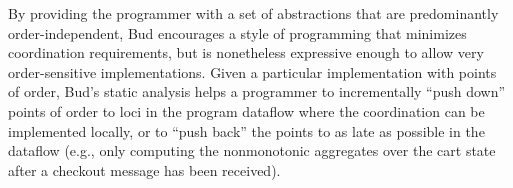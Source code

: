 By providing the programmer with a set of abstractions that are predominantly 
order-independent, Bud encourages a style of programming that minimizes  
coordination requirements, 
but is nonetheless expressive enough to allow very order-sensitive implementations. 
Given a particular implementation with points of order, Bud's 
static analysis helps a programmer to incrementally ``push down'' points of order
to loci in the program dataflow where the coordination can be implemented locally, or to 
``push back'' the points to as late as possible in the dataflow (e.g., only computing the
nonmonotonic aggregates over the cart state after a checkout message has been received).


